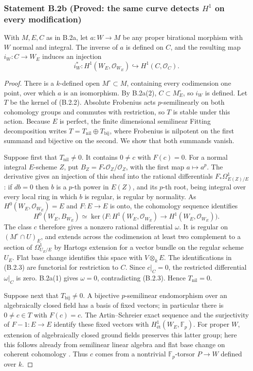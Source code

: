 \subsubsection*{Statement B.2b (Proved: the same curve detects $H^1$ on every modification)}
With $M,E,C$ as in B.2a, let $a:W\to M$ be any proper birational
morphism with $W$ normal and integral.  The inverse of $a$ is
defined on $C$, and the resulting map $i_W:C\to W_E$ induces an
injection
\[
 i_W^*:H^1(W_E,\mathcal O_{W_E})
 \hookrightarrow H^1(C,\mathcal O_C).
 \tag{B.2.2}
\]
\begin{proof}
There is a $k$-defined open $M^\circ\subset M$, containing every
codimension one point, over which $a$ is an isomorphism.  By
B.2a(2), $C\subset M^\circ_E$, so $i_W$ is defined.
Let $T$ be the kernel of (B.2.2).  Absolute Frobenius acts
$p$-semilinearly on both cohomology groups and commutes with
restriction, so $T$ is stable under this action.  Because $E$
is perfect, the finite dimensional semilinear Fitting decomposition
writes $T=T_{\mathrm{nil}}\oplus T_{\mathrm{bij}}$, where Frobenius
is nilpotent on the first summand and bijective on the second.
We show that both summands vanish.

Suppose first that $T_{\mathrm{nil}}\ne0$.  It contains
$0\ne c$ with $F(c)=0$.  For a normal integral $E$-scheme $Z$,
put $B_Z=F_*\mathcal O_Z/\mathcal O_Z$, with the first map
$a\mapsto a^p$.  The derivative gives an injection of this
sheaf into the rational differentials $F_*\Omega^1_{E(Z)/E}$:
if $db=0$ then $b$ is a $p$-th power in $E(Z)$, and its
$p$-th root, being integral over every local ring in which $b$
is regular, is regular by normality.  As
$H^0(W_E,\mathcal O_{W_E})=E$ and $F:E\to E$ is onto, the
cohomology sequence identifies
\[
 H^0(W_E,B_{W_E})
 \simeq \ker\bigl(F:H^1(W_E,\mathcal O_{W_E})
                         \to H^1(W_E,\mathcal O_{W_E})\bigr).
 \tag{B.2.3}
\]
The class $c$ therefore gives a nonzero rational differential
$\omega$.  It is regular on $(M^\circ\cap U)_E$, and extends
across the codimension at least two complement to a section of
$\Omega^1_{U_E/E}$ by Hartogs extension for a vector bundle on
the regular scheme $U_E$.  Flat base change identifies this
space with $V\otimes_kE$.  The identifications in (B.2.3) are
functorial for restriction to $C$.  Since $c|_C=0$, the
restricted differential $\omega|_C$ is zero.  B.2a(1) gives
$\omega=0$, contradicting (B.2.3).  Hence $T_{\mathrm{nil}}=0$.

Suppose next that $T_{\mathrm{bij}}\ne0$.  A bijective
$p$-semilinear endomorphism over an algebraically closed field
has a basis of fixed vectors; in particular there is
$0\ne c\in T$ with $F(c)=c$.  The Artin--Schreier exact sequence
and the surjectivity of $F-1:E\to E$ identify these fixed vectors
with $H^1_{\text{ét}}(W_E,\mathbb F_p)$.  For proper
$W$, extension of algebraically closed ground fields preserves
this latter group; here this follows already from semilinear
linear algebra and flat base change on coherent cohomology
\cite[Lemmas 59.63.3 and 59.63.6, Tag 0A3P]{StacksB}.
Thus $c$ comes from a nontrivial $\mathbb F_p$-torsor $P\to W$
defined over $k$.


\end{proof}
